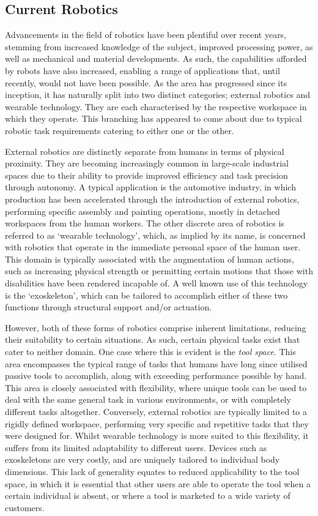 \documentclass[11pt]{article}
\begin{document}
\subsection{Current Robotics}
Advancements in the field of robotics have been plentiful over recent years, stemming from increased knowledge of the subject, improved processing power, as well as mechanical and material developments. As such, the capabilities afforded by robots have also increased, enabling a range of applications that, until recently, would not have been possible. As the area has progressed since its inception, it has naturally split into two distinct categories; external robotics and wearable technology. They are each characterised by the respective workspace in which they operate. This branching has appeared to come about due to typical robotic task requirements catering to either one or the other.

External robotics are distinctly separate from humans in terms of physical proximity. They are becoming increasingly common in large-scale industrial spaces due to their ability to provide improved efficiency and task precision through autonomy. A typical application is the automotive industry, in which production has been accelerated through the introduction of external robotics, performing specific assembly and painting operations, mostly in detached workspaces from the human workers. The other discrete area of robotics is referred to as `wearable technology', which, as implied by its name, is concerned with robotics that operate in the immediate personal space of the human user. This domain is typically associated with the augmentation of human actions, such as increasing physical strength or permitting certain motions that those with disabilities have been rendered incapable of. A well known use of this technology is the `exoskeleton', which can be tailored to accomplish either of these two functions through structural support and/or actuation.

However, both of these forms of robotics comprise inherent limitations, reducing their suitability to certain situations. As such, certain physical tasks exist that cater to neither domain. One case where this is evident is the \textit{tool space}. This area encompasses the typical range of tasks that humans have long since utilised passive tools to accomplish, along with exceeding performance possible by hand. This area is closely associated with flexibility, where unique tools can be used to deal with the same general task in various environments, or with completely different tasks altogether. Conversely, external robotics are typically limited to a rigidly defined workspace, performing very specific and repetitive tasks that they were designed for. Whilst wearable technology is more suited to this flexibility, it suffers from its limited adaptability to different users. Devices such as exoskeletons are very costly, and are uniquely tailored to individual body dimensions. This lack of generality equates to reduced applicability to the tool space, in which it is essential that other users are able to operate the tool when a certain individual is absent, or where a tool is marketed to a wide variety of customers.
\end{document}
